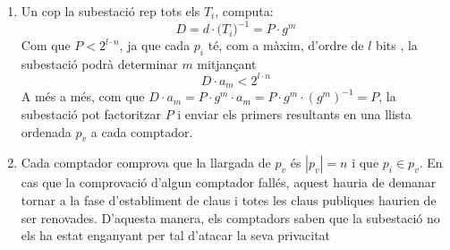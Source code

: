 \begin{enumerate}
\begin{enumerate}
		\item Un cop la subestació rep tots els $T_i$, computa:
		\[D = d \cdot \Big( T_i \Big)^{-1} = P \cdot g^m\]
		Com que $P < 2^{l \cdot n}$, ja que cada $p_i$ té, com a màxim, d'ordre de $l$ bits , la subestació podrà determinar $m$ mitjançant
		\[D \cdot a_m  < 2^{l \cdot n}\]
		A més a més, com que $D \cdot a_m = P \cdot g^m \cdot a_m = P \cdot g^m \cdot (g^m)^{-1} = P$, la subestació pot factoritzar $P$ i enviar els primers resultants en una llista ordenada $p_v$ a cada comptador.
		\item Cada comptador comprova que la llargada de $p_v$ és $|p_v| = n$ i que $p_i \in p_v$. En cas que la comprovació d'algun comptador fallés, aquest hauria de demanar tornar a la fase d'establiment de claus i totes les claus publiques haurien de ser renovades. D'aquesta manera, els comptadors saben que la subestació no els ha estat enganyant per tal d'atacar la seva privacitat
		
	\end{enumerate}
\end{enumerate}


